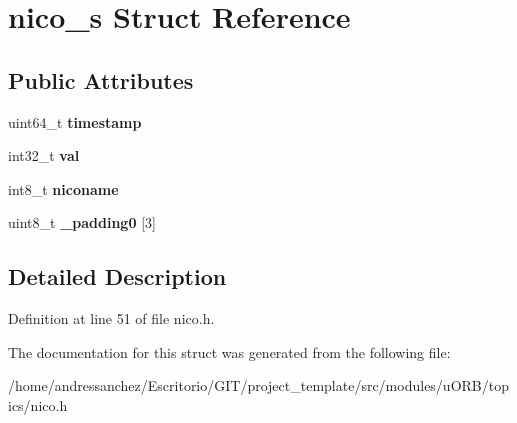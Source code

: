 \hypertarget{structnico__s}{}\section{nico\+\_\+s Struct Reference}
\label{structnico__s}
\subsection*{Public Attributes}
\begin{DoxyCompactItemize}
\item 
\mbox{\label{structnico__s_ad318d16de270fbbe297d456aacb651f0}} 
uint64\+\_\+t {\bfseries timestamp}
\item 
\mbox{\label{structnico__s_a29adf13a3a57b14f79372d8074cb0cc1}} 
int32\+\_\+t {\bfseries val}
\item 
\mbox{\label{structnico__s_a276787c164dc90a4b38e2c59897ca522}} 
int8\+\_\+t {\bfseries niconame}
\item 
\mbox{\label{structnico__s_acf9de52a1d911dfccf2b716b619633b3}} 
uint8\+\_\+t {\bfseries \+\_\+padding0} \mbox{[}3\mbox{]}
\end{DoxyCompactItemize}


\subsection{Detailed Description}


Definition at line 51 of file nico.\+h.



The documentation for this struct was generated from the following file\+:\begin{DoxyCompactItemize}
\item 
/home/andressanchez/\+Escritorio/\+G\+I\+T/project\+\_\+template/src/modules/u\+O\+R\+B/topics/nico.\+h\end{DoxyCompactItemize}

